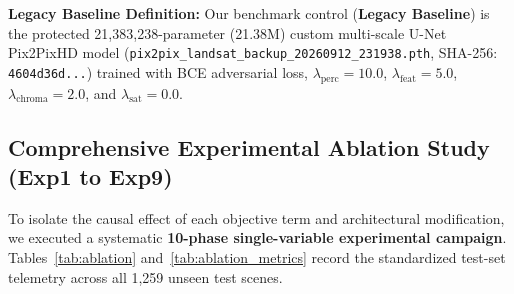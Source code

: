 \documentclass[10pt,a4paper,twoside]{article}
\begin{document}
\noindent\textbf{Legacy Baseline Definition:} Our benchmark control (\textbf{Legacy Baseline}) is the protected 21,383,238-parameter (21.38M) custom multi-scale U-Net Pix2PixHD model (\texttt{pix2pix\_landsat\_backup\_20260912\_231938.pth}, SHA-256: \texttt{4604d36d...}) trained with BCE adversarial loss, $\lambda_{\mathrm{perc}} = 10.0$, $\lambda_{\mathrm{feat}} = 5.0$, $\lambda_{\mathrm{chroma}} = 2.0$, and $\lambda_{\mathrm{sat}} = 0.0$.

\subsection{Comprehensive Experimental Ablation Study (Exp1 to Exp9)}
To isolate the causal effect of each objective term and architectural modification, we executed a systematic \textbf{10-phase single-variable experimental campaign}. Tables~\ref{tab:ablation} and~\ref{tab:ablation_metrics} record the standardized test-set telemetry across all 1,259 unseen test scenes.
\end{document}
